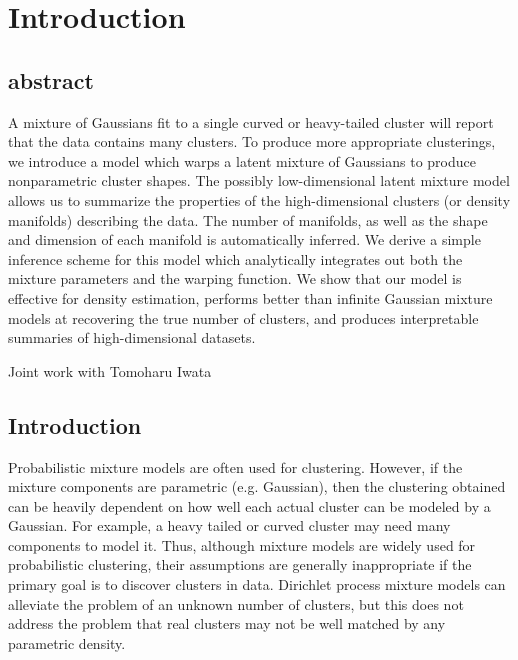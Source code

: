 
\inbpdocument

\chapter{Introduction}
\label{ch:intro}

\section{abstract}
A mixture of Gaussians fit to a single curved or heavy-tailed cluster will report that the data contains many clusters.  
To produce more appropriate clusterings, we introduce a model which warps a latent mixture of Gaussians to produce nonparametric cluster shapes.  
The possibly low-dimensional latent mixture model allows us to summarize the properties of the high-dimensional clusters (or density manifolds) describing the data.  
The number of manifolds, as well as the shape and dimension of each manifold is automatically inferred.
We derive a simple inference scheme for this model which analytically integrates out both the mixture parameters and the warping function.  
We show that our model is effective for density estimation, performs better than infinite Gaussian mixture models at recovering the true number of clusters, and produces interpretable summaries of high-dimensional datasets.

Joint work with Tomoharu Iwata 


\section{Introduction}
Probabilistic mixture models are often used for clustering.
However, if the mixture components are parametric (e.g. Gaussian), then the clustering obtained can be heavily dependent on how well each actual cluster can be modeled by a Gaussian.
For example, a heavy tailed or curved cluster may need many components to model it.
Thus, although mixture models are widely used for probabilistic clustering, their assumptions are generally inappropriate if the primary goal is to discover clusters in data.
Dirichlet process mixture models can alleviate the problem of an unknown number of clusters, but this does not address the problem that real clusters may not be well matched by any parametric density.

